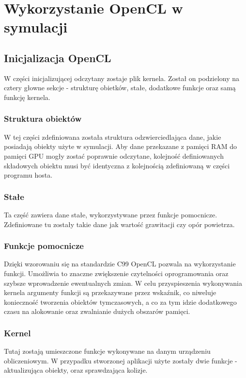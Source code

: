 \chapter{Wykorzystanie OpenCL w symulacji}

\section{Inicjalizacja OpenCL}
W części inicjalizującej odczytany zostaje plik kernela. Został on podzielony na cztery głowne sekcje - strukturę obietków, stałe, dodatkowe funkcje oraz samą funkcję kernela.

\subsection{Struktura obiektów}
W tej części zdefiniowana została struktura odzwierciedlająca dane, jakie posiadają obiekty użyte w symulacji. Aby dane przekazane z pamięci RAM do pamięci GPU mogły zostać poprawnie odczytane, kolejność definiowanych składowych obiektu musi być identyczna z kolejnością zdefiniowaną w części programu hosta.

\subsection{Stałe}
Ta część zawiera dane stałe, wykorzystywane przez funkcje pomocnicze. Zdefiniowane tu zostały takie dane jak wartość grawitacji czy opór powietrza.

\subsection{Funkcje pomocnicze}
Dzięki wzorowaniu się na standardzie C99 OpenCL pozwala na wykorzystanie funkcji. Umożliwia to znaczne zwiększenie czytelności oprogramowania oraz szybsze wprowadzenie ewentualnych zmian. W celu przyspieszenia wykonywania kernela argumenty funkcji są przekazywane przez wskaźnik, co niweluje konieczność tworzenia obiektów tymczasowych, a co za tym idzie dodatkowego czasu na alokowanie oraz zwalnianie dużych obszarów pamięci.
\newpage
\subsection{Kernel}
Tutaj zostają umieszczone funkcje wykonywane na danym urządzeniu obliczeniowym. W przypadku stworzonej aplikacji użyte zostały dwie funkcje - aktualizująca obiekty, oraz sprawdzająca kolizje.

